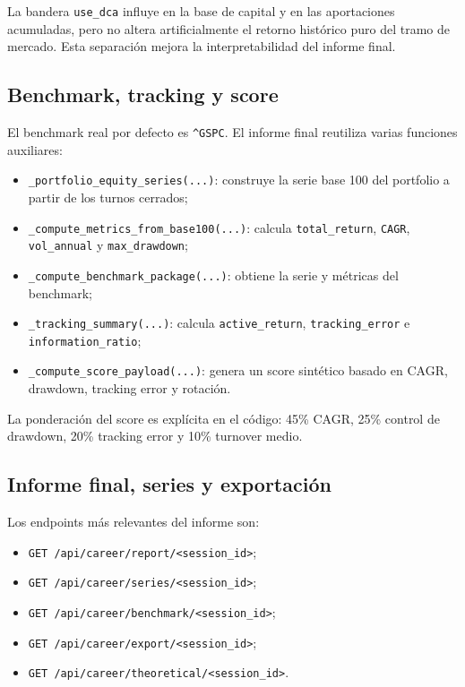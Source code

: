La bandera \texttt{use\_dca} influye en la base de capital y en las aportaciones acumuladas, pero no altera artificialmente el retorno histórico puro del tramo de mercado. Esta separación mejora la interpretabilidad del informe final.

\subsection{Benchmark, tracking y score}

El benchmark real por defecto es \texttt{\^{}GSPC}. El informe final reutiliza varias funciones auxiliares:

\begin{itemize}
    \item \texttt{\_portfolio\_equity\_series(...)}: construye la serie base 100 del portfolio a partir de los turnos cerrados;
    \item \texttt{\_compute\_metrics\_from\_base100(...)}: calcula \texttt{total\_return}, \texttt{CAGR}, \texttt{vol\_annual} y \texttt{max\_drawdown};
    \item \texttt{\_compute\_benchmark\_package(...)}: obtiene la serie y métricas del benchmark;
    \item \texttt{\_tracking\_summary(...)}: calcula \texttt{active\_return}, \texttt{tracking\_error} e \texttt{information\_ratio};
    \item \texttt{\_compute\_score\_payload(...)}: genera un score sintético basado en CAGR, drawdown, tracking error y rotación.
\end{itemize}

La ponderación del score es explícita en el código: 45\% CAGR, 25\% control de drawdown, 20\% tracking error y 10\% turnover medio.

\subsection{Informe final, series y exportación}

Los endpoints más relevantes del informe son:

\begin{itemize}
    \item \texttt{GET /api/career/report/<session\_id>};
    \item \texttt{GET /api/career/series/<session\_id>};
    \item \texttt{GET /api/career/benchmark/<session\_id>};
    \item \texttt{GET /api/career/export/<session\_id>};
    \item \texttt{GET /api/career/theoretical/<session\_id>}.
\end{itemize}

